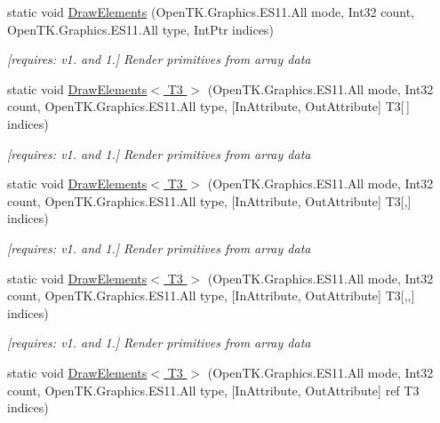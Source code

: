 \begin{DoxyCompactItemize}
static void \hyperlink{class_open_t_k_1_1_graphics_1_1_e_s11_1_1_g_l_af5ec8d8748fee3ab4f0f8e0904a82895}{Draw\-Elements} (Open\-T\-K.\-Graphics.\-E\-S11.\-All mode, Int32 count, Open\-T\-K.\-Graphics.\-E\-S11.\-All type, Int\-Ptr indices)
\begin{DoxyCompactList}\small\item\em \mbox{[}requires\-: v1. and 1.\mbox{]} Render primitives from array data \end{DoxyCompactList}\item 
static void \hyperlink{class_open_t_k_1_1_graphics_1_1_e_s11_1_1_g_l_a96305f6061dc044f9a6f93f9781070e8}{Draw\-Elements$<$ T3 $>$} (Open\-T\-K.\-Graphics.\-E\-S11.\-All mode, Int32 count, Open\-T\-K.\-Graphics.\-E\-S11.\-All type, \mbox{[}In\-Attribute, Out\-Attribute\mbox{]} T3\mbox{[}$\,$\mbox{]} indices)
\begin{DoxyCompactList}\small\item\em \mbox{[}requires\-: v1. and 1.\mbox{]} Render primitives from array data \end{DoxyCompactList}\item 
static void \hyperlink{class_open_t_k_1_1_graphics_1_1_e_s11_1_1_g_l_a1e7d852dab4c8472cad90afcc26e33d5}{Draw\-Elements$<$ T3 $>$} (Open\-T\-K.\-Graphics.\-E\-S11.\-All mode, Int32 count, Open\-T\-K.\-Graphics.\-E\-S11.\-All type, \mbox{[}In\-Attribute, Out\-Attribute\mbox{]} T3\mbox{[},\mbox{]} indices)
\begin{DoxyCompactList}\small\item\em \mbox{[}requires\-: v1. and 1.\mbox{]} Render primitives from array data \end{DoxyCompactList}\item 
static void \hyperlink{class_open_t_k_1_1_graphics_1_1_e_s11_1_1_g_l_a0a0e0373147adeb6886081ddacc445fc}{Draw\-Elements$<$ T3 $>$} (Open\-T\-K.\-Graphics.\-E\-S11.\-All mode, Int32 count, Open\-T\-K.\-Graphics.\-E\-S11.\-All type, \mbox{[}In\-Attribute, Out\-Attribute\mbox{]} T3\mbox{[},,\mbox{]} indices)
\begin{DoxyCompactList}\small\item\em \mbox{[}requires\-: v1. and 1.\mbox{]} Render primitives from array data \end{DoxyCompactList}\item 
static void \hyperlink{class_open_t_k_1_1_graphics_1_1_e_s11_1_1_g_l_af094c98e64573b519dc9324b4b37e536}{Draw\-Elements$<$ T3 $>$} (Open\-T\-K.\-Graphics.\-E\-S11.\-All mode, Int32 count, Open\-T\-K.\-Graphics.\-E\-S11.\-All type, \mbox{[}In\-Attribute, Out\-Attribute\mbox{]} ref T3 indices)

\end{DoxyCompactItemize}
